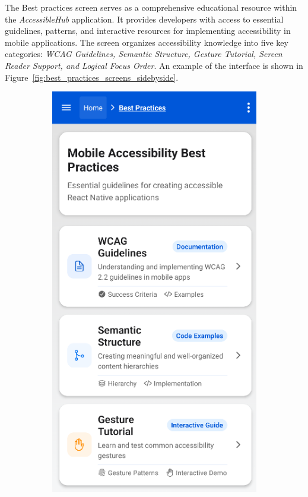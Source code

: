 The Best practices screen serves as a comprehensive educational resource within the \textit{AccessibleHub} application. It provides developers with access to essential guidelines, patterns, and interactive resources for implementing accessibility in mobile applications. The screen organizes accessibility knowledge into five key categories: \textit{WCAG Guidelines, Semantic Structure, Gesture Tutorial, Screen Reader Support, and Logical Focus Order}. An example of the interface is shown in Figure~\ref{fig:best_practices_screens_sidebyside}.

\begin{figure}[ht]
    \centering
    \begin{subfigure}[b]{0.48\textwidth}
        \centering
        \includegraphics[width=\linewidth, alt={First part of the Best practices screen}]{img/practices1.png}

\end{subfigure}
\end{figure}
